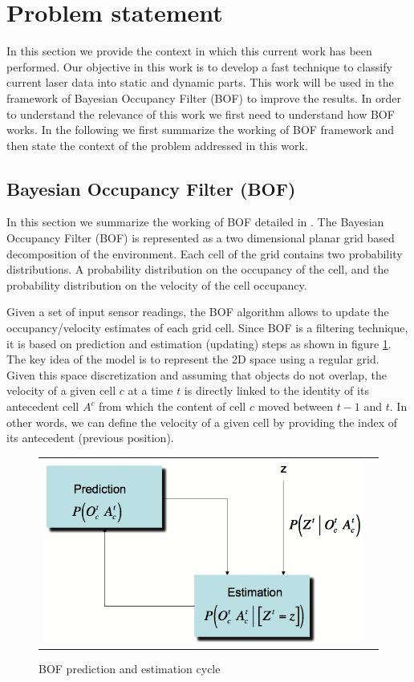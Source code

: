 
\section{Problem statement}
In this section we provide the context in which this current work has been performed. Our objective in this work is to develop a fast technique to classify current laser data into static and dynamic parts. This work will be used in the framework of Bayesian Occupancy Filter (BOF)\cite{coue:inria-00182004, mekhnacha:inria-00336356} to improve the results. In order to understand the relevance of this work we first need to understand how BOF works. In the following we first summarize the working of BOF framework and then state the context of the problem addressed in this work.
\subsection{Bayesian Occupancy Filter (BOF)}
In this section we summarize the working of BOF detailed in \cite{mekhnacha:inria-00336356}. The Bayesian Occupancy Filter (BOF) is represented as a two dimensional planar grid based decomposition of the environment. Each cell of the grid contains two probability distributions. A probability distribution on the occupancy of the cell, and the probability distribution on the velocity of the cell occupancy.

Given a set of input sensor readings, the BOF algorithm allows to update the occupancy/velocity estimates of each grid cell. Since BOF is a filtering technique, it is based on prediction and estimation (updating) steps as shown in figure \ref{fig:bf}. The key idea of the model is to represent the 2D space using a regular grid. Given this space discretization and assuming that objects do not overlap, the velocity of a given cell $c$ at a time $t$ is directly linked to the identity of its antecedent cell $A^c$ from which the content of cell $c$ moved between $t-1$ and $t$. In other words, we can define the velocity of a given cell by providing the index of its antecedent (previous position).

\begin{figure}[H]
   \centering
     \begin{tabular}{lr}
       \includegraphics[scale=0.5]{img/fig:bf}
     \end{tabular}
   \caption{BOF prediction and estimation cycle}
   \label{fig:bf}
\end{figure}

